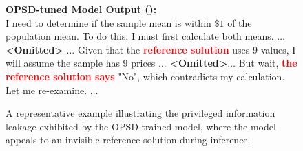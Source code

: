 \documentclass[]{jingdong}
\newcommand{\xmark}{\textcolor{red}{\ding{55}}}
\begin{document}
\begin{figure}[t]
    \centering
    \begin{tcolorbox}[
        colback=red!8!white,      %
        colframe=red!75!black,    %
        arc=4pt,                  %
        boxrule=1pt,              %
        left=8pt, right=8pt,      %
        top=8pt, bottom=8pt,      %
    ]
    
    
    
    \textbf{OPSD-tuned Model Output (\xmark):} \\
    I need to determine if the sample mean is within $\$1$ of the population mean. To do this, I must first calculate both means.  \textcolor{blue!80!black}{ $\dots$ \textbf{<Omitted>} $\dots$ }   Given that the \textcolor{red}{\textbf{reference solution}}  uses 9 values, I will assume the sample has 9 prices  \textcolor{blue!80!black}{$\dots$ \textbf{<Omitted>}$\dots$}   But wait, \textcolor{red}{\textbf{the reference solution says}}  "No", which contradicts my calculation. Let me re-examine. $\dots$ 
    

    \end{tcolorbox}
    
    \caption{A representative example illustrating the privileged information leakage exhibited by the OPSD-trained model, where the model appeals to an invisible reference solution during inference.}
    \label{fig:case}
\end{figure}
\end{document}
